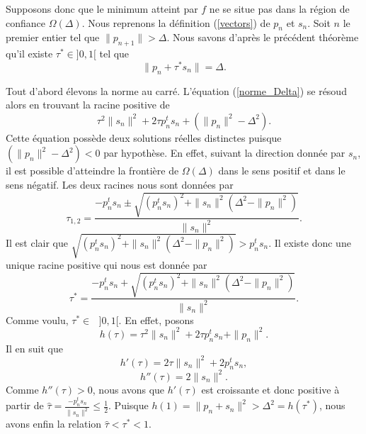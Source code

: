 \noindent
\begin{result}
    Supposons donc que le minimum atteint par $f$ ne se situe pas dans la région de confiance $\Omega(\Delta)$. Nous reprenons la définition (\ref{vectors}) de $p_n$ et $s_n$. Soit $n$ le premier entier tel que $\|p_{n+1}\| > \Delta$. Nous savons d'après le précédent théorème qu'il existe $\tau^* \in \text{} ]0, 1[$ tel que 
    \begin{equation}\tag{6} \label{norme_Delta}
        \|p_n + \tau^* s_n \| = \Delta.
    \end{equation}
\end{result}
Tout d'abord élevons la norme au carré. L'équation (\ref{norme_Delta}) se résoud alors en trouvant la racine positive de
\begin{equation}\tag{7}
    \tau^2 \|s_n\|^2 + 2 \tau p_n^t s_n + (\|p_n\|^2 - \Delta^2).
\end{equation}
Cette équation possède deux solutions réelles distinctes puisque $(\|p_n\|^2 - \Delta^2) < 0$ par hypothèse. En effet, suivant la direction donnée par $s_n$, il est possible d'atteindre la frontière de $\Omega(\Delta)$ dans le sens positif et dans le sens négatif.
Les deux racines nous sont données par
\begin{equation}\tag{8}
    \tau_{1, 2} = \frac{-p_n^t s_{n} \pm \sqrt{(p_n^t s_{n})^2 + \|s_n\|^2(\Delta^2 - \|p_n\|^2)}}{\|s_n\|^2}.
\end{equation}
Il est clair que $\sqrt{(p_n^t s_{n})^2 + \|s_n\|^2(\Delta^2 - \|p_n\|^2)} > p_n^t s_{n}$. Il existe donc une unique racine positive qui nous est donnée par
\begin{equation}\tag{9}
    \tau^* = \frac{-p_n^t s_{n} + \sqrt{(p_n^t s_{n})^2 + \|s_n\|^2(\Delta^2 - \|p_n\|^2)}}{\|s_n\|^2}.
\end{equation}
Comme voulu, $\tau^* \in \text{ } ]0, 1[$. En effet, posons
\begin{equation}\tag{10}
    h(\tau) = \tau^2 \|s_n\|^2 + 2 \tau p_n^t s_n + \|p_n\|^2.
\end{equation}
Il en suit que
\begin{equation}\tag{11.a}
    h'(\tau) = 2\tau \|s_n\|^2 + 2p_n^ts_n,
\end{equation}
\vspace{-0.5cm}
\begin{equation}\tag{11.b}
    h''(\tau) = 2\|s_n\|^2.
\end{equation}
Comme $h''(\tau) > 0$, nous avons que $h'(\tau)$ est croissante et donc positive à partir de $\hat{\tau} = \frac{-p_n^ts_n}{\|s_n\|^2} \leq \frac{1}{2}$. Puisque $h(1) = \|p_n + s_n\|^2 > \Delta^2 = h(\tau^*)$, nous avons enfin la relation $\hat{\tau} < \tau^* < 1$.

